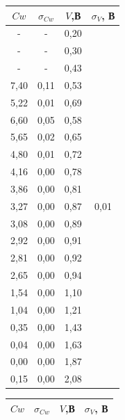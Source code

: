 \documentclass[a4paper,12pt]{report}
\begin{document}
\begin{table}[H]
\begin{tabular}{|c|c|c|c|}
\hline
$Cw$   & $\sigma_{Cw}$ & $V$,В  & $\sigma_V$, В              \\ \hline
-    & -       & 0,20 & \multirow{21}{*}{0,01} \\ \cline{1-3}
-    & -       & 0,30 &                        \\ \cline{1-3}
-    & -       & 0,43 &                        \\ \cline{1-3}
7,40 & 0,11    & 0,53 &                        \\ \cline{1-3}
5,22 & 0,01    & 0,69 &                        \\ \cline{1-3}
6,60 & 0,05    & 0,58 &                        \\ \cline{1-3}
5,65 & 0,02    & 0,65 &                        \\ \cline{1-3}
4,80 & 0,01    & 0,72 &                        \\ \cline{1-3}
4,16 & 0,00    & 0,78 &                        \\ \cline{1-3}
3,86 & 0,00    & 0,81 &                        \\ \cline{1-3}
3,27 & 0,00    & 0,87 &                        \\ \cline{1-3}
3,08 & 0,00    & 0,89 &                        \\ \cline{1-3}
2,92 & 0,00    & 0,91 &                        \\ \cline{1-3}
2,81 & 0,00    & 0,92 &                        \\ \cline{1-3}
2,65 & 0,00    & 0,94 &                        \\ \cline{1-3}
1,54 & 0,00    & 1,10 &                        \\ \cline{1-3}
1,04 & 0,00    & 1,21 &                        \\ \cline{1-3}
0,35 & 0,00    & 1,43 &                        \\ \cline{1-3}
0,04 & 0,00    & 1,63 &                        \\ \cline{1-3}
0,00 & 0,00    & 1,87 &                        \\ \cline{1-3}
0,15 & 0,00    & 2,08 &                        \\ \hline
\end{tabular}
\hspace{1cm}
\begin{tabular}{|c|c|c|c|}
\hline
$Cw$   & $\sigma_{Cw}$ & $V$,В  & $\sigma_V$, В       \\ \hline

\end{tabular}
\end{table}
\end{document}
